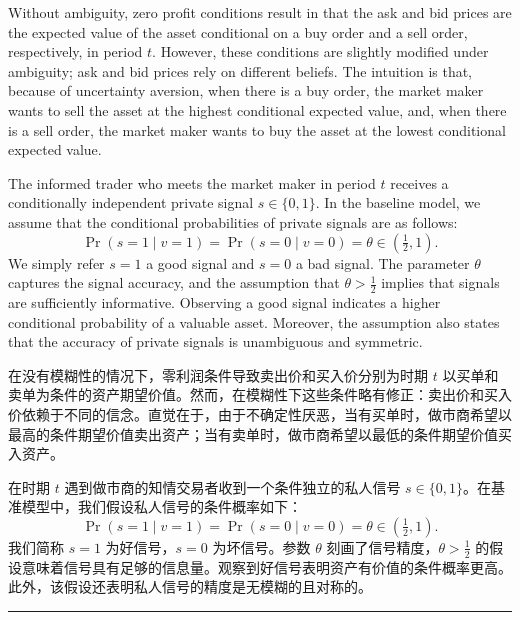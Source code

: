 \documentclass[12pt,a4paper]{article}
\newenvironment{original}{%
  \par\vspace{4pt}\noindent%
  \color{black}%
  \ignorespaces
}{%
  \par\vspace{2pt}%
}
\newenvironment{translation}{%
  \par\vspace{2pt}\noindent%
  \color{transblue}%
  \ignorespaces
}{%
  \par\vspace{4pt}\hrule\vspace{6pt}%
}
\begin{document}
\begin{original}
Without ambiguity, zero profit conditions result in that the ask and bid prices are the expected value of the asset conditional on a buy order and a sell order, respectively, in period $t$. However, these conditions are slightly modified under ambiguity; ask and bid prices rely on different beliefs. The intuition is that, because of uncertainty aversion, when there is a buy order, the market maker wants to sell the asset at the highest conditional expected value, and, when there is a sell order, the market maker wants to buy the asset at the lowest conditional expected value.

The informed trader who meets the market maker in period $t$ receives a conditionally independent private signal $s \in \{0, 1\}$. In the baseline model, we assume that the conditional probabilities of private signals are as follows:
\[
\Pr(s = 1 \mid v = 1) = \Pr(s = 0 \mid v = 0) = \theta \in (\tfrac{1}{2}, 1). \tag{2.3}
\]
We simply refer $s = 1$ a good signal and $s = 0$ a bad signal. The parameter $\theta$ captures the signal accuracy, and the assumption that $\theta > \frac{1}{2}$ implies that signals are sufficiently informative. Observing a good signal indicates a higher conditional probability of a valuable asset. Moreover, the assumption also states that the accuracy of private signals is unambiguous and symmetric.
\end{original}
\begin{translation}
在没有模糊性的情况下，零利润条件导致卖出价和买入价分别为时期 $t$ 以买单和卖单为条件的资产期望价值。然而，在模糊性下这些条件略有修正：卖出价和买入价依赖于不同的信念。直觉在于，由于不确定性厌恶，当有买单时，做市商希望以最高的条件期望价值卖出资产；当有卖单时，做市商希望以最低的条件期望价值买入资产。

在时期 $t$ 遇到做市商的知情交易者收到一个条件独立的私人信号 $s \in \{0, 1\}$。在基准模型中，我们假设私人信号的条件概率如下：
\[
\Pr(s = 1 \mid v = 1) = \Pr(s = 0 \mid v = 0) = \theta \in (\tfrac{1}{2}, 1). \tag{2.3}
\]
我们简称 $s = 1$ 为好信号，$s = 0$ 为坏信号。参数 $\theta$ 刻画了信号精度，$\theta > \frac{1}{2}$ 的假设意味着信号具有足够的信息量。观察到好信号表明资产有价值的条件概率更高。此外，该假设还表明私人信号的精度是无模糊的且对称的。
\end{translation}
\end{document}
